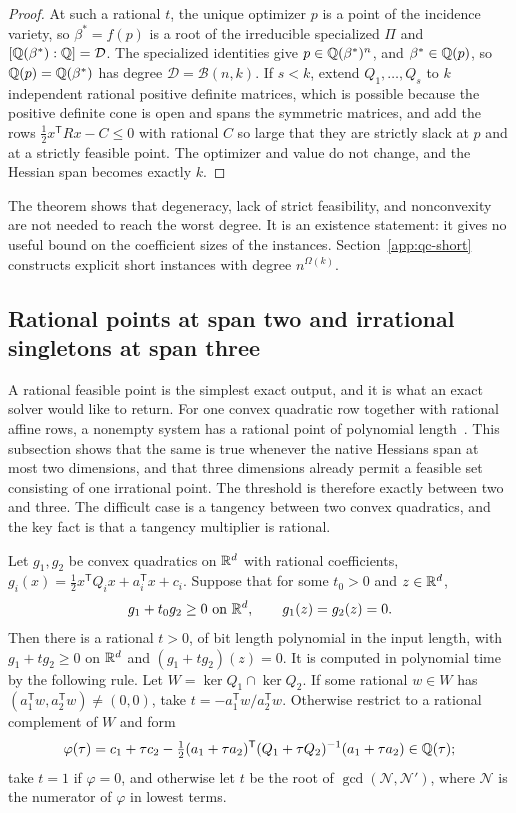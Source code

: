 \begin{proof}
At such a rational $t$, the unique optimizer $p$ is a point of the incidence
variety, so $\beta^*=f(p)$ is a root of the irreducible specialized $\Pi$ and
$[\mathbb Q(\beta^*):\mathbb Q]=\mathcal D$. The specialized identities give
$p\in\mathbb Q(\beta^*)^n$, and $\beta^*\in\mathbb Q(p)$, so $\mathbb Q(p)=\mathbb Q(\beta^*)$ has degree
$\mathcal D=\mathcal B(n,k)$. If $s<k$, extend $Q_1,\ldots,Q_s$ to $k$
independent rational positive definite matrices, which is possible because
the positive definite cone is open and spans the symmetric matrices, and add
the rows $\tfrac12x^{\mathsf T}Rx-C\le0$ with rational $C$ so large that they
are strictly slack at $p$ and at a strictly feasible point. The optimizer and
value do not change, and the Hessian span becomes exactly $k$.
\end{proof}

The theorem shows that degeneracy, lack of strict feasibility, and
nonconvexity are not needed to reach the worst degree. It is an existence
statement: it gives no useful bound on the coefficient sizes of the
instances. Section~\ref{app:qc-short} constructs explicit short instances with
degree $n^{\Omega(k)}$.

\subsection{Rational points at span two and irrational singletons at span three}
\label{app:qc-rational}

A rational feasible point is the simplest exact output, and it is what an
exact solver would like to return. For one convex quadratic row together with
rational affine rows, a nonempty system has a rational point of polynomial
length~\cite{Vavasis1990,DelPiaDeyMolinaro2017}. This subsection shows that
the same is true whenever the native Hessians span at most two dimensions, and
that three dimensions already permit a feasible set consisting of one
irrational point. The threshold is therefore exactly between two and three.
The difficult case is a tangency between two convex quadratics, and the key
fact is that a tangency multiplier is rational.

\begin{lemma}
\label{lem:qc-tangency}
Let $g_1,g_2$ be convex quadratics on $\mathbb R^d$ with rational coefficients,
$g_i(x)=\tfrac12x^{\mathsf T}Q_ix+a_i^{\mathsf T}x+c_i$. Suppose that for
some $t_0>0$ and $z\in\mathbb R^d$,
\[
g_1+t_0g_2\ge0\ \text{on }\mathbb R^d,\qquad g_1(z)=g_2(z)=0 .
\]
Then there is a rational $t>0$, of bit length polynomial in the input length,
with $g_1+tg_2\ge0$ on $\mathbb R^d$ and $(g_1+tg_2)(z)=0$. It is computed in
polynomial time by the following rule. Let $W=\ker Q_1\cap\ker Q_2$. If some
rational $w\in W$ has $(a_1^{\mathsf T}w,a_2^{\mathsf T}w)\ne(0,0)$, take
$t=-a_1^{\mathsf T}w/a_2^{\mathsf T}w$. Otherwise restrict to a rational
complement of $W$ and form
\[
\varphi(\tau)=c_1+\tau c_2-\tfrac12(a_1+\tau a_2)^{\mathsf T}
(Q_1+\tau Q_2)^{-1}(a_1+\tau a_2)\in\mathbb Q(\tau);
\]
take $t=1$ if $\varphi=0$, and otherwise let $t$ be the root of
$\gcd(\mathcal N,\mathcal N')$, where $\mathcal N$ is the numerator of
$\varphi$ in lowest terms.
\end{lemma}

